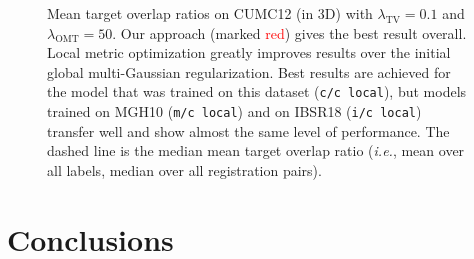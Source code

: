 \documentclass[10pt,twocolumn,letterpaper,table]{article}
\numberwithin{equation}{section}
\theoremstyle{plain}
\theoremstyle{definition}
\def\ie{\emph{i.e.}}  \def\Ie{\emph{I.e.}}
\begin{document}
\begin{figure}
  
  \caption{Mean target overlap ratios on CUMC12 (in 3D) with $\lambda_{\text{TV}}=0.1$ and $\lambda_{\text{OMT}}=50$. Our approach (marked \textcolor{red}{red}) gives the best result overall. Local metric optimization greatly improves results over the initial global multi-Gaussian regularization. Best results are achieved for the model that was trained on this dataset (\texttt{c/c local}), but models trained on MGH10 (\texttt{m/c local}) and on IBSR18 (\texttt{i/c local}) transfer well and show almost the same level of performance.
    The dashed line is the median mean target overlap ratio (\ie, mean over all labels, median over all registration pairs).}
  \label{fig:boxplot_overlap_3d_test_cumc12}
  \vspace{-0.3cm}
\end{figure}

\begin{table}
  \caption{Mean (standard deviation) of \emph{determinant of Jacobian} of $\Phi^{-1}$ for global and local regularization with $\lambda_{\text{TV}}=0.1$ and $\lambda_{\text{OMT}}=50$ for CUMC12 within the brain. Local metric optimization (local) improves target overlap measures (see Fig.~\ref{fig:boxplot_overlap_3d_test_cumc12}) at the cost of less regular deformations than for global multi-Gaussian regularization. However, the reported determinants of Jacobian are still all positive, indicating no folding.}
  \label{tab:jacobian_across_stages_cumc12_3d}
  \vspace{-0.3cm}
 \end{table}

\vspace{-0.2cm}
\section{Conclusions}
\label{sec:discussion}
\end{document}
